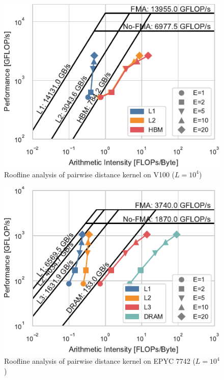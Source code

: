 \documentclass[conference]{IEEEtran}
\begin{document}
\begin{figure}
    \centering
    \includegraphics{figs/roofline_distances_v100}
    \caption{Roofline analysis of pairwise distance kernel on V100 ($L=10^4$)}%
    \label{fig:roofline-distances-v100}
\end{figure}

\begin{figure}
    \centering
    \includegraphics{figs/roofline_distances_epyc}
    \caption{Roofline analysis of pairwise distance kernel on EPYC 7742 ($L=10^4$)}%
    \label{fig:roofline-distances-epyc}
\end{figure}
\end{document}
